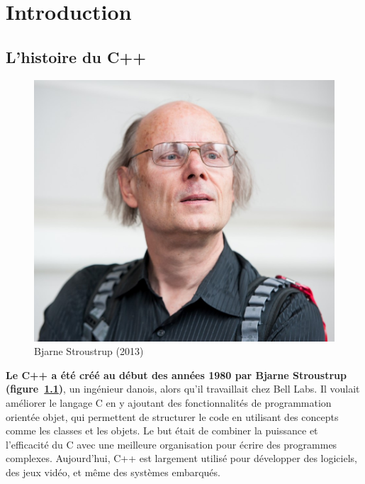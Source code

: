 \chapter{Introduction}
\section{L'histoire du C++}

\begin{figure}[ht]
	\centering
	\includegraphics{Images/bjarne_stroustrup}
	\caption{Bjarne Stroustrup (2013)}
	\label{bjarne_stroustrup}
\end{figure}

\textbf{Le C++ a été créé au début des années 1980 par Bjarne Stroustrup (figure~\ref{bjarne_stroustrup})}, un ingénieur danois, alors qu'il travaillait chez Bell Labs. Il voulait améliorer le langage C en y ajoutant des fonctionnalités de programmation orientée objet, qui permettent de structurer le code en utilisant des concepts comme les classes et les objets. Le but était de combiner la puissance et l'efficacité du C avec une meilleure organisation pour écrire des programmes complexes. Aujourd'hui, C++ est largement utilisé pour développer des logiciels, des jeux vidéo, et même des systèmes embarqués.

